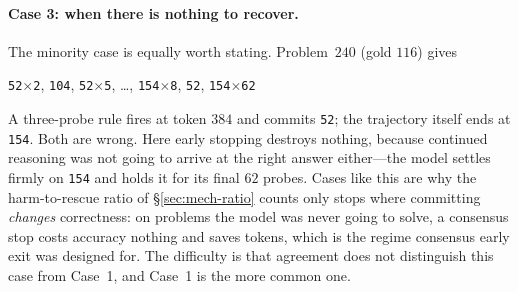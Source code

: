 \paragraph{Case 3: when there is nothing to recover.}
The minority case is equally worth stating. Problem~$240$ (gold $116$) gives
\begin{center}\small
\texttt{52}$\times$\texttt{2},\; \texttt{104},\; \texttt{52}$\times$\texttt{5},\;
\ldots,\; \texttt{154}$\times$\texttt{8},\; \texttt{52},\;
\texttt{154}$\times$\texttt{62}
\end{center}
A three-probe rule fires at token $384$ and commits \texttt{52}; the trajectory
itself ends at \texttt{154}. Both are wrong. Here early stopping destroys
nothing, because continued reasoning was not going to arrive at the right answer
either---the model settles firmly on \texttt{154} and holds it for its final $62$
probes. Cases like this are why the harm-to-rescue ratio of
\S\ref{sec:mech-ratio} counts only stops where committing \emph{changes}
correctness: on problems the model was never going to solve, a consensus stop
costs accuracy nothing and saves tokens, which is the regime consensus early exit
was designed for. The difficulty is that agreement does not distinguish this case
from Case~1, and Case~1 is the more common one.
